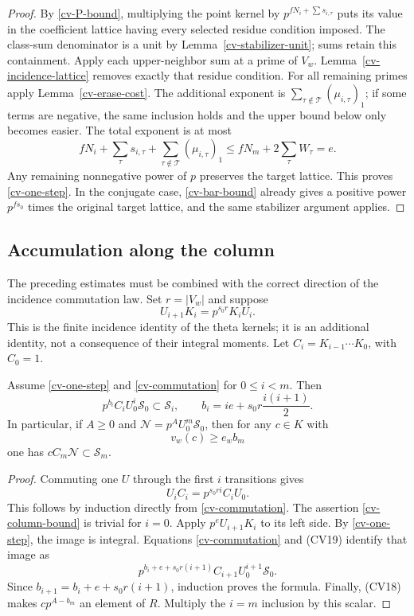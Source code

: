 \begin{proof}
By \eqref{cv-P-bound}, multiplying the point kernel by
$p^{fN_i+\sum s_{i,\tau}}$ puts its value in the coefficient
lattice having every selected residue condition imposed.  The
class-sum denominator is a unit by
Lemma~\ref{cv-stabilizer-unit}; sums retain this containment.
Apply each upper-neighbor sum at a prime of $V_w$.
Lemma~\ref{cv-incidence-lattice} removes exactly that residue
condition.  For all remaining primes apply
Lemma~\ref{cv-erase-cost}.  The additional exponent is
$\sum_{\tau\notin\mathcal T}(\mu_{i,\tau})_1$; if some terms
are negative, the same inclusion holds and the upper bound below
only becomes easier.  The total exponent is at most
\[
 fN_i+\sum_\tau s_{i,\tau}
       +\sum_{\tau\notin\mathcal T}(\mu_{i,\tau})_1
                    \le fN_m+2\sum_\tau W_\tau=e.
\]
Any remaining nonnegative power of $p$ preserves the target
lattice.  This proves \eqref{cv-one-step}.
In the conjugate case, \eqref{cv-bar-bound} already gives a positive
power $p^{fs_0}$ times the original target lattice, and the same
stabilizer argument applies.
\end{proof}

\subsection{Accumulation along the column}

The preceding estimates must be combined with the correct direction
of the incidence commutation law.  Set $r=|V_w|$ and suppose
\begin{equation}\label{cv-commutation}
                         U_{i+1}K_i=p^{s_0r}K_iU_i.
\end{equation}
This is the finite incidence identity of the theta kernels; it is
an additional identity, not a consequence of their integral moments.
Let
$C_i=K_{i-1}\cdots K_0$, with $C_0=1$.

\begin{proposition}\label{cv-column}
Assume \eqref{cv-one-step} and \eqref{cv-commutation} for
$0\le i<m$.  Then
\begin{equation}\label{cv-column-bound}
 p^{b_i}C_iU_0^i\mathscr S_0\subset\mathscr S_i,\qquad
 b_i=ie+s_0r\frac{i(i+1)}2.
\end{equation}
In particular, if $A\ge0$ and
$\mathscr N=p^AU_0^m\mathscr S_0$, then for any $c\in K$ with
\[
                          v_w(c)\ge e_wb_m
 \tag{CV18}
\]
one has $cC_m\mathscr N\subset\mathscr S_m$.
\end{proposition}
\begin{proof}
Commuting one $U$ through the first $i$ transitions gives
\[
                         U_iC_i=p^{s_0ri}C_iU_0.
 \tag{CV19}
\]
This follows by induction directly from \eqref{cv-commutation}.
The assertion \eqref{cv-column-bound} is trivial for $i=0$.
Apply $p^eU_{i+1}K_i$ to its left side.  By
\eqref{cv-one-step}, the image is integral.  Equations
\eqref{cv-commutation} and (CV19) identify that image as
\[
 p^{b_i+e+s_0r(i+1)}C_{i+1}U_0^{i+1}\mathscr S_0.
\]
Since $b_{i+1}=b_i+e+s_0r(i+1)$, induction proves the formula.
Finally, (CV18) makes $cp^{A-b_m}$ an element of $R$.
Multiply the $i=m$ inclusion by this scalar.
\end{proof}

